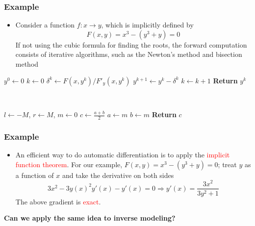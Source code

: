 \documentclass[usenames,dvipsnames]{beamer}
\begin{document}
\begin{frame}
	\frametitle{Example}
	
\begin{itemize}
	\item Consider a function $f:x\rightarrow y$, which is implicitly defined by 
	$$F(x,y) = x^3 - (y^3+y) = 0$$
If not using the cubic formula for finding the roots, the forward computation consists of iterative algorithms, such as the Newton's method and bisection method
\end{itemize}



\begin{minipage}[t]{0.48\textwidth}
\centering
\begin{algorithmic}
\State $y^0 \gets 0$
\State $k \gets 0$
\State $\delta^k \gets F(x, y^k)/F'_y(x,y^k)$
\State $y^{k+1}\gets y^k - \delta^k$
\State $k \gets k+1$
\EndWhile
\State \textbf{Return} $y^k$
\end{algorithmic}
\end{minipage}~
\begin{minipage}[t]{0.48\textwidth}
\centering
\begin{algorithmic}
\State $l \gets -M$, $r\gets M$, $m\gets 0$
\State $c \gets \frac{a+b}{2}$
\State $a\gets m$
\Else
\State $b\gets m$
\EndIf
\EndWhile
\State \textbf{Return} $c$
\end{algorithmic}

\end{minipage}	

\end{frame}

\begin{frame}
	\frametitle{Example}

	\begin{itemize}
		\item An efficient way to do automatic differentiation is to apply the \textcolor{red}{implicit function theorem}. For our example, $F(x,y)=x^3-(y^3+y)=0$; treat $y$ as a function of $x$ and take the derivative on both sides
		      $$3x^2 - 3y(x)^2y'(x)-y'(x)=0\Rightarrow y'(x) = \frac{3x^2}{3y^2+1}$$
		      The above gradient is \textcolor{red}{exact}.
	\end{itemize}
	\begin{center}
		\textbf{Can we apply the same idea to inverse modeling?}
	\end{center}

\end{frame}
\end{document}

